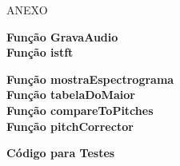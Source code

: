 \vspace*{\fill}
\begingroup
\centering

\huge{ANEXO}

\endgroup
\vspace*{\fill}

\newpage
\thispagestyle{empty}
\textbf{Função GravaAudio}
\\

\thispagestyle{empty}
\textbf{Função istft}
\\


\thispagestyle{empty}

\textbf{Função mostraEspectrograma}
\\


\textbf{Função tabelaDoMaior}
\\

\thispagestyle{empty}
\textbf{Função compareToPitches}
\\


\textbf{Função pitchCorrector}
\\


\thispagestyle{empty}
\newpage

\textbf{Código para Testes}
\\

\thispagestyle{empty}